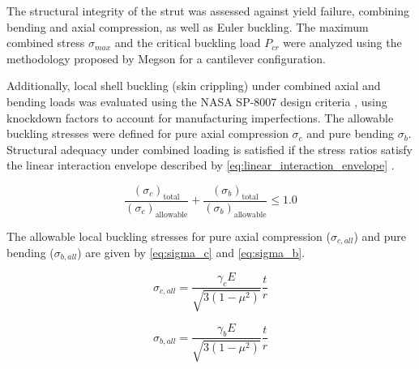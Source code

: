 The structural integrity of the strut was assessed against yield failure, combining bending and axial compression, as well as Euler buckling. The maximum combined stress $\sigma_{max}$ and the critical buckling load $P_{cr}$ were analyzed using the methodology proposed by Megson \cite[p. 256]{megson2016aircraft} for a cantilever configuration.

Additionally, local shell buckling (skin crippling) under combined axial and bending loads was evaluated using the NASA SP-8007 design criteria \cite{NASA_SP8007_2019}, using knockdown factors to account for manufacturing imperfections. The allowable buckling stresses were defined for pure axial compression $\sigma_{c}$ and pure bending $\sigma_{b}$. Structural adequacy under combined loading is satisfied if the stress ratios satisfy the linear interaction envelope described by \autoref{eq:linear_interaction_envelope} \cite[p. 31]{NASA_SP8007_2019}.

\begin{equation}
\label{eq:linear_interaction_envelope}
    \frac{(\sigma_c)_\text{total}}{(\sigma_c)_\text{allowable}} + \frac{(\sigma_b)_\text{total}}{(\sigma_b)_\text{allowable}} \le 1.0
\end{equation}

The allowable local buckling stresses for pure axial compression ($\sigma_{c,all}$) and pure bending ($\sigma_{b,all}$) are given by \autoref{eq:sigma_c} and \autoref{eq:sigma_b}.

\noindent
\begin{minipage}{0.48\textwidth}
\begin{equation}
\sigma_{c,all} = \frac{\gamma_c E}{\sqrt{3(1-\mu^2)}} \frac{t}{r}
\label{eq:sigma_c}
\end{equation}
\end{minipage}
\hfill
\begin{minipage}{0.48\textwidth}
\begin{equation}
\sigma_{b,all} = \frac{\gamma_b E}{\sqrt{3(1-\mu^2)}} \frac{t}{r}
\label{eq:sigma_b}
\end{equation}
\end{minipage}

